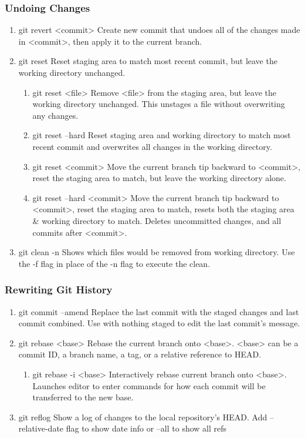 \documentclass[11pt]{article}
\begin{document}
\subsubsection{Undoing Changes}
\label{sec-1-1-2}
\begin{enumerate}
\item git revert <commit>
\label{sec-1-1-2-1}
Create new commit that undoes all of the changes made in
<commit>, then apply it to the current branch.
\item git reset
\label{sec-1-1-2-2}
Reset staging area to match most recent commit, but leave the
working directory unchanged.
\begin{enumerate}
\item git reset <file>
\label{sec-1-1-2-2-1}
Remove <file> from the staging area, but leave the working directory
unchanged. This unstages a file without overwriting any changes.
\item git reset --hard
\label{sec-1-1-2-2-2}
Reset staging area and working directory to match most recent
commit and overwrites all changes in the working directory.
\item git reset <commit>
\label{sec-1-1-2-2-3}
Move the current branch tip backward to <commit>, reset the
staging area to match, but leave the working directory alone.
\item git reset --hard <commit>
\label{sec-1-1-2-2-4}
Move the current branch tip backward to <commit>, reset the
staging area to match, resets both the staging area \& working directory to
match. Deletes uncommitted changes, and all commits after <commit>.
\end{enumerate}
\item git clean -n
\label{sec-1-1-2-3}
Shows which files would be removed from working directory. Use
the -f flag in place of the -n flag to execute the clean.
\end{enumerate}
\subsubsection{Rewriting Git History}
\label{sec-1-1-3}
\begin{enumerate}
\item git commit --amend
\label{sec-1-1-3-1}
Replace the last commit with the staged changes and last commit
combined. Use with nothing staged to edit the last commit’s message.
\item git rebase <base>
\label{sec-1-1-3-2}
Rebase the current branch onto <base>. <base> can be a commit ID,
a branch name, a tag, or a relative reference to HEAD.
\begin{enumerate}
\item git rebase -i <base>
\label{sec-1-1-3-2-1}
Interactively rebase current branch onto <base>. Launches editor to enter
commands for how each commit will be transferred to the new base.
\end{enumerate}
\item git reflog
\label{sec-1-1-3-3}
Show a log of changes to the local repository’s HEAD. Add
--relative-date flag to show date info or --all to show all refs
\end{enumerate}
\end{document}
